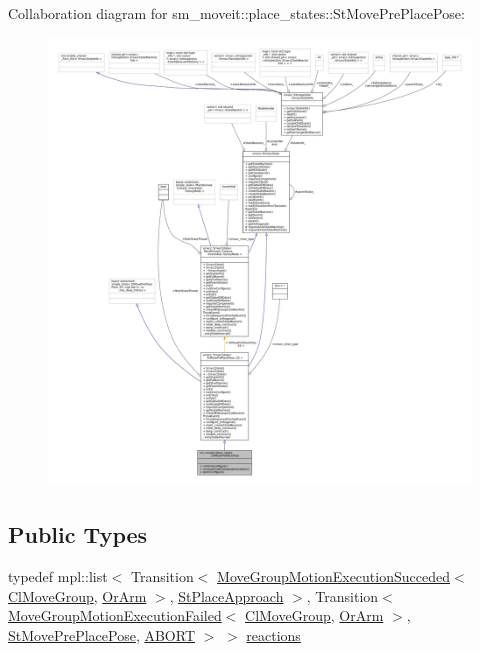 Collaboration diagram for sm\+\_\+moveit\+:\+:place\+\_\+states\+:\+:St\+Move\+Pre\+Place\+Pose\+:
\nopagebreak
\begin{figure}[H]
\begin{center}
\leavevmode
\includegraphics[width=350pt]{structsm__moveit_1_1place__states_1_1StMovePrePlacePose__coll__graph}
\end{center}
\end{figure}
\subsection*{Public Types}
\begin{DoxyCompactItemize}
\item 
typedef mpl\+::list$<$ Transition$<$ \hyperlink{structsm__moveit_1_1cl__movegroup_1_1MoveGroupMotionExecutionSucceded}{Move\+Group\+Motion\+Execution\+Succeded}$<$ \hyperlink{classsm__moveit_1_1cl__movegroup_1_1ClMoveGroup}{Cl\+Move\+Group}, \hyperlink{classsm__moveit_1_1OrArm}{Or\+Arm} $>$, \hyperlink{structsm__moveit_1_1place__states_1_1StPlaceApproach}{St\+Place\+Approach} $>$, Transition$<$ \hyperlink{structsm__moveit_1_1cl__movegroup_1_1MoveGroupMotionExecutionFailed}{Move\+Group\+Motion\+Execution\+Failed}$<$ \hyperlink{classsm__moveit_1_1cl__movegroup_1_1ClMoveGroup}{Cl\+Move\+Group}, \hyperlink{classsm__moveit_1_1OrArm}{Or\+Arm} $>$, \hyperlink{structsm__moveit_1_1place__states_1_1StMovePrePlacePose}{St\+Move\+Pre\+Place\+Pose}, \hyperlink{classABORT}{A\+B\+O\+RT} $>$ $>$ \hyperlink{structsm__moveit_1_1place__states_1_1StMovePrePlacePose_aba9e304feab2249eac1087dd2e4f6719}{reactions}
\end{DoxyCompactItemize}
